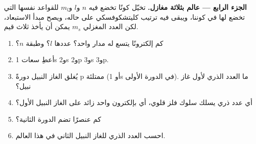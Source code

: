 \begin{problem}
\medskip
\noindent\textbf{الجزء الرابع --- عالم بثلاثة مغازل.}
تخيّل كونًا تخضع فيه $n$ و$l$ و$m_l$ للقواعد نفسها التي تخضع لها في
كوننا، ويبقى فيه ترتيب كليتشكوفسكي على حاله، ويصح مبدأ الاستبعاد،
لكن العدد المغزلي $m_s$ يمكن أن يأخذ ثلاث قيم.
\begin{enumerate}[resume]
  \item كم إلكترونًا يتسع له مدار واحد؟  عددها
        $l$؟ وطبقة $n$؟
  \item أعطِ سعات 1s و2s و2p و3s و3p.
  \item يُغلق الغاز النبيل دورةً  p ممتلئة (أو 1s في
        الدورة الأولى). ما العدد الذري لأول غاز نبيل؟
  \item أي عدد ذري يسلك سلوك فلز قلوي، أي بإلكترون
        واحد زائد على الغاز النبيل الأول؟
  \item كم عنصرًا تضم الدورة الثانية؟
  \item احسب العدد الذري للغاز النبيل الثاني في هذا العالم.
\end{enumerate}
\end{problem}
